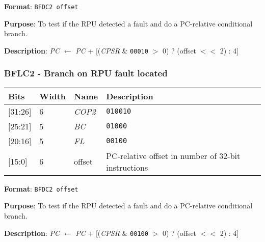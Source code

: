 \documentclass[11pt]{article}
\begin{document}
\textbf{Format}: \texttt{BFDC2 offset}

\textbf{Purpose}: To test if the RPU detected a fault and do a PC-relative conditional branch.

\textbf{Description}: \emph{PC} $\leftarrow$ \emph{PC} + [(\emph{CPSR} \& \texttt{00010} $>$ 0) ? (offset $<<$ 2) : 4]

\text{}
\subsubsection{BFLC2 - Branch on RPU fault located}
\text{}

\begin{table}[H] \centering
  \def\arraystretch{1.4}
  \begin{tabular}{|m{2cm}|m{1.5cm}|m{2.5cm}|m{4.5cm}|}
    \hline
    \textbf{Bits} & \textbf{Width} & \textbf{Name} & \textbf{Description}\\ \hline

    [31:26] & 6 & \emph{COP2} & \texttt{010010}\\ \hline

    [25:21] & 5 & \emph{BC} & \texttt{01000}\\ \hline

    [20:16] & 5 & \emph{FL} & \texttt{00100}\\ \hline

    [15:0] & 6 & offset & PC-relative offset in number of 32-bit instructions\\ \hline
  \end{tabular}
\end{table}

\textbf{Format}: \texttt{BFDC2 offset}

\textbf{Purpose}: To test if the RPU detected a fault and do a PC-relative conditional branch.

\textbf{Description}: \emph{PC} $\leftarrow$ \emph{PC} + [(\emph{CPSR} \& \texttt{00100} $>$ 0) ? (offset $<<$ 2) : 4]
\end{document}

